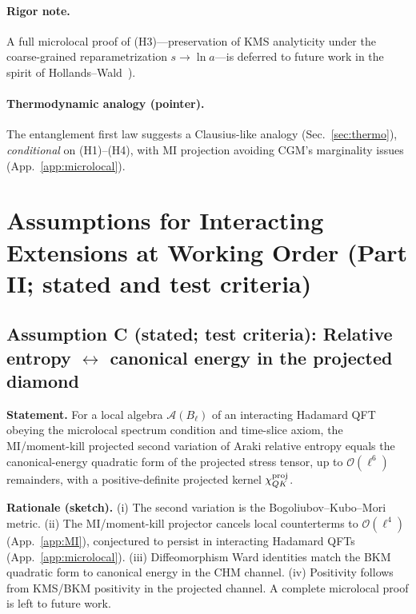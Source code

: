 \documentclass[aps,prd,onecolumn,superscriptaddress,nofootinbib]{revtex4-2}
\begin{document}
\paragraph{Rigor note.}
A full microlocal proof of (H3)—preservation of KMS analyticity under the coarse-grained reparametrization \(s\!\to\!\ln a\)—is deferred to future work in the spirit of Hollands–Wald~\cite{HollandsWald2001}).

\paragraph{Thermodynamic analogy (pointer).}
The entanglement first law suggests a Clausius-like analogy (Sec.~\ref{sec:thermo}), \emph{conditional} on (H1)–(H4), with MI projection avoiding CGM’s marginality issues (App.~\ref{app:microlocal}).

\section{Assumptions for Interacting Extensions at Working Order (Part II; stated and test criteria)}
\label{sec:proofs}

\subsection{Assumption C (stated; test criteria): Relative entropy \texorpdfstring{$\leftrightarrow$}{<->} canonical energy in the projected diamond}
\label{sec:lemmaC}

\noindent\textbf{Statement.} For a local algebra \(\mathcal A(B_\ell)\) of an interacting Hadamard QFT obeying the microlocal spectrum condition and time-slice axiom, the MI/moment-kill projected second variation of Araki relative entropy equals the canonical-energy quadratic form of the projected stress tensor, up to \(\mathcal O(\ell^6)\) remainders, with a positive-definite projected kernel \(\chi_{QK}^{\rm proj}\).

\smallskip
\noindent\textbf{Rationale (sketch).} (i) The second variation is the Bogoliubov–Kubo–Mori metric. (ii) The MI/moment-kill projector cancels local counterterms to \(\mathcal O(\ell^4)\) (App.~\ref{app:MI}), conjectured to persist in interacting Hadamard QFTs (App.~\ref{app:microlocal}). (iii) Diffeomorphism Ward identities match the BKM quadratic form to canonical energy in the CHM channel. (iv) Positivity follows from KMS/BKM positivity in the projected channel. A complete microlocal proof is left to future work.
\end{document}
